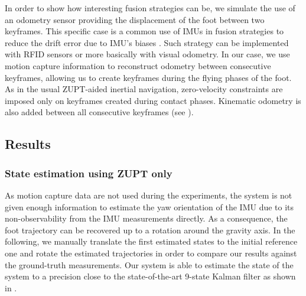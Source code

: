 In order to show how interesting fusion strategies can be, we simulate the use of an odometry sensor providing the displacement of the foot between two keyframes.
This specific case is a common use of IMUs in fusion strategies to reduce the drift error due to IMU's biases \cite{santamaria2015high}. %
Such strategy can be implemented with RFID sensors or more basically with visual odometry. 
In our case, we use motion capture information to reconstruct odometry between consecutive keyframes, allowing us to create keyframes during the flying phases of the foot. As in the usual ZUPT-aided inertial
navigation, zero-velocity constraints are imposed only on keyframes created during contact phases. Kinematic odometry is also added between all consecutive keyframes (see ).

%

\subsection{Results}
\subsubsection{State estimation using ZUPT only}


As motion capture data are not used during the experiments, the system is not given enough information to estimate the yaw orientation of the IMU due to its non-observability from the IMU measurements directly. 
As a consequence, the foot trajectory can be recovered up to a rotation around the gravity axis. 
In the following, we manually translate the first estimated states to the initial reference one and rotate the estimated trajectories in order to compare our results against the ground-truth measurements.
Our system is able to estimate the state of the system to a precision close to the state-of-the-art 9-state Kalman filter \cite{foxlin2005pedestrian} as shown in .

